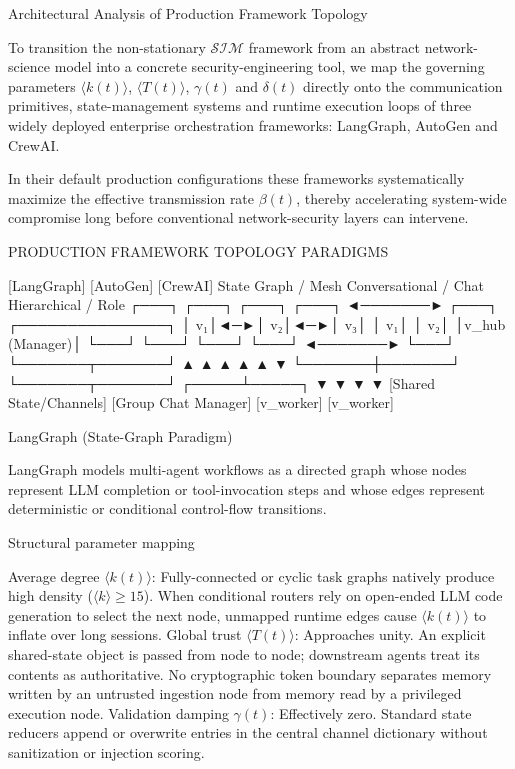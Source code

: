 Architectural Analysis of Production Framework Topology

To transition the non-stationary \(\mathcal{S}\mathcal{I}\mathcal{M}\) framework from an abstract network-science model into a concrete security-engineering tool, we map the governing parameters \(\langle k(t)\rangle\), \(\langle T(t)\rangle\), \(\gamma(t)\) and \(\delta(t)\) directly onto the communication primitives, state-management systems and runtime execution loops of three widely deployed enterprise orchestration frameworks: LangGraph, AutoGen and CrewAI.

In their default production configurations these frameworks systematically maximize the effective transmission rate \(\beta(t)\), thereby accelerating system-wide compromise long before conventional network-security layers can intervene.

                      PRODUCTION FRAMEWORK TOPOLOGY PARADIGMS
                      
       [LangGraph]                   [AutoGen]                   [CrewAI]
  State Graph / Mesh            Conversational / Chat        Hierarchical / Role
 ┌───┐   ┌───┐   ┌───┐         ┌───┐ ◄───────► ┌───┐         ┌───────────────┐
 │ v₁│◄─►│ v₂│◄─►│ v₃│         │ v₁│           │ v₂│         │v_hub (Manager)│
 └───┘   └───┘   └───┘         └───┘ ◄───────► └───┘         └───────┬───────┘
   ▲       ▲       ▲             ▲               ▲                   ▼
   └───────┼───────┘             └───────┬───────┘             ┌─────┴─────┐
           ▼                             ▼                     ▼           ▼
   [Shared State/Channels]     [Group Chat Manager]        [v_worker]  [v_worker]

LangGraph (State-Graph Paradigm)

LangGraph models multi-agent workflows as a directed graph whose nodes represent LLM completion or tool-invocation steps and whose edges represent deterministic or conditional control-flow transitions.

Structural parameter mapping

Average degree \(\langle k(t)\rangle\): Fully-connected or cyclic task graphs natively produce high density (\(\langle k\rangle\ge 15\)). When conditional routers rely on open-ended LLM code generation to select the next node, unmapped runtime edges cause \(\langle k(t)\rangle\) to inflate over long sessions.
Global trust \(\langle T(t)\rangle\): Approaches unity. An explicit shared-state object is passed from node to node; downstream agents treat its contents as authoritative. No cryptographic token boundary separates memory written by an untrusted ingestion node from memory read by a privileged execution node.
Validation damping \(\gamma(t)\): Effectively zero. Standard state reducers append or overwrite entries in the central channel dictionary without sanitization or injection scoring.

